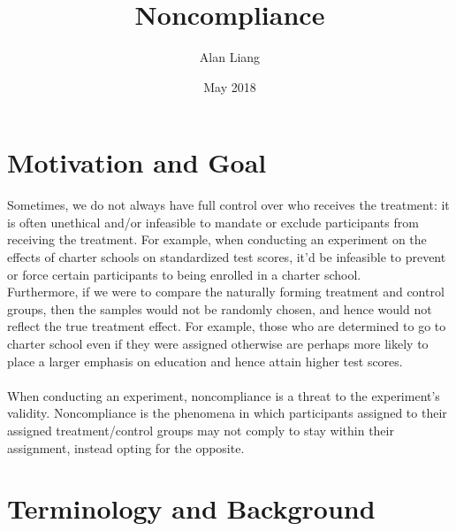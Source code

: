 \documentclass{article}
\title{Noncompliance}
\author{Alan Liang}
\date{May 2018}
\begin{document}
\maketitle

\section{Motivation and Goal}

Sometimes, we do not always have full control over who receives the treatment: it is often unethical and/or infeasible to mandate or exclude participants from receiving the treatment.
For example, when conducting an experiment on the effects of charter schools on standardized test scores, it'd be infeasible to prevent or force certain participants to being enrolled in a charter school. 
\\
Furthermore, if we were to compare the naturally forming treatment and control groups, then the samples would not be randomly chosen, and hence would not reflect the true treatment effect. 
For example, those who are determined to go to charter school even if they were assigned otherwise are perhaps more likely to place a larger emphasis on education and hence attain higher test scores.
\\
\\
When conducting an experiment, noncompliance is a threat to the experiment's validity.
Noncompliance is the phenomena in which participants assigned to their assigned treatment/control groups may not comply to stay within their assignment, instead opting for the opposite. 

\section{Terminology and Background} 
\end{document}
